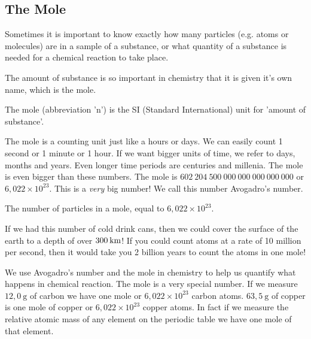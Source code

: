            \subsection*{The Mole}
            \nopagebreak
      \label{m38717*id275573}Sometimes it is important to know exactly how many particles (e.g. atoms or molecules) are in a sample of a substance, or what quantity of a substance is needed for a chemical reaction to take place.\par 
\label{m38717*eip-872}The amount of substance is so important in chemistry that it is given it's own name, which is the mole.  \par \label{m38717*fhsst!!!underscore!!!id119}\pagebreak
{} { The mole (abbreviation 'n') is the SI (Standard International) unit for 'amount of substance'. \par 
       } 
The mole is a counting unit just like a hours or days. We can easily count 1 second or 1 minute or 1 hour. If we want bigger units of time, we refer to days, months and years. Even longer time periods are centuries and millenia. The mole is even bigger than these numbers. The mole is $602 ~204 ~500 ~000 ~000 ~000 ~000 ~000$ or $6,022 \times 10^{23}$. This is a \textsl{very} big number! We call this number Avogadro's number. \label{m38717*fhsst!!!underscore!!!id123}
 { \label{m38717*meaningfhsst!!!underscore!!!id123}
      \label{m38717*id276010}The number of particles in a mole, equal to $6,022\ensuremath{\times}{10}^{23}$. \par 
       } 
\label{m38717*eip-446}If we had this number of cold drink cans, then we could cover the surface of the earth to a depth of over $300\phantom{\rule{2pt}{0ex}}\text{km}$! If you could count atoms at a rate of 10 million per second, then it would take you 2 billion years to count the atoms in one mole!\par \label{m38717*notfhsst!!!underscore!!!id126}
We use Avogadro's number and the mole in chemistry to help us quantify what happens in chemical reaction. The mole is a very special number. If we measure $12,0 ~\text{g}$ of carbon we have one mole or $6,022 \times 10^{23}$ carbon atoms. $63,5 ~\text{g}$ of copper is one mole of copper or $6,022 \times 10^{23}$ copper atoms. In fact if we measure the relative atomic mass of any element on the periodic table we have one mole of that element.
